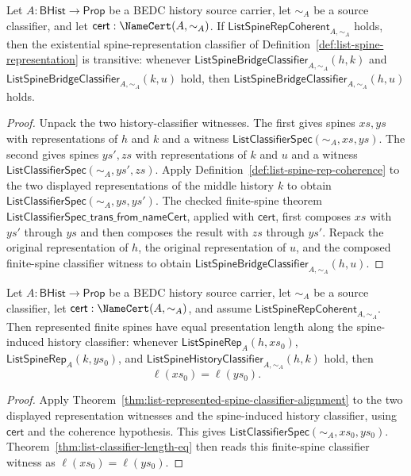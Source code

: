 \begin{theorem}
\label{thm:list-history-classifier-trans-from-spine-coherence}
Let $A:\mathsf{BHist}\to\mathsf{Prop}$ be a BEDC history source carrier, let $\sim_A$ be a source classifier, and let $\mathsf{cert}:\NameCert(A,\sim_A)$. If $\mathsf{ListSpineRepCoherent}_{A,\sim_A}$ holds, then the existential spine-representation classifier of Definition~\ref{def:list-spine-representation} is transitive: whenever $\mathsf{ListSpineBridgeClassifier}_{A,\sim_A}(h,k)$ and $\mathsf{ListSpineBridgeClassifier}_{A,\sim_A}(k,u)$ hold, then $\mathsf{ListSpineBridgeClassifier}_{A,\sim_A}(h,u)$ holds.
\end{theorem}
\begin{proof}
Unpack the two history-classifier witnesses. The first gives spines $xs,ys$ with representations of $h$ and $k$ and a witness $\mathsf{ListClassifierSpec}(\sim_A,xs,ys)$. The second gives spines $ys',zs$ with representations of $k$ and $u$ and a witness $\mathsf{ListClassifierSpec}(\sim_A,ys',zs)$. Apply Definition~\ref{def:list-spine-rep-coherence} to the two displayed representations of the middle history $k$ to obtain $\mathsf{ListClassifierSpec}(\sim_A,ys,ys')$. The checked finite-spine theorem $\mathsf{ListClassifierSpec\_trans\_from\_nameCert}$, applied with $\mathsf{cert}$, first composes $xs$ with $ys'$ through $ys$ and then composes the result with $zs$ through $ys'$. Repack the original representation of $h$, the original representation of $u$, and the composed finite-spine classifier witness to obtain $\mathsf{ListSpineBridgeClassifier}_{A,\sim_A}(h,u)$.
\end{proof}

\begin{theorem}
\label{thm:list-spine-classifier-represented-length}
Let $A:\mathsf{BHist}\to\mathsf{Prop}$ be a BEDC history source carrier, let
$\sim_A$ be a source classifier, let $\mathsf{cert}:\NameCert(A,\sim_A)$, and
assume $\mathsf{ListSpineRepCoherent}_{A,\sim_A}$. Then represented finite spines have equal presentation length along the spine-induced history classifier: whenever $\mathsf{ListSpineRep}_A(h,xs_0)$, $\mathsf{ListSpineRep}_A(k,ys_0)$, and $\mathsf{ListSpineHistoryClassifier}_{A,\sim_A}(h,k)$ hold, then
$$
\ell(xs_0)=\ell(ys_0).
$$
\end{theorem}
\begin{proof}
Apply Theorem~\ref{thm:list-represented-spine-classifier-alignment} to the two
displayed representation witnesses and the spine-induced history classifier,
using $\mathsf{cert}$ and the coherence hypothesis. This gives
$\mathsf{ListClassifierSpec}(\sim_A,xs_0,ys_0)$. Theorem~\ref{thm:list-classifier-length-eq}
then reads this finite-spine classifier witness as $\ell(xs_0)=\ell(ys_0)$.
\end{proof}

